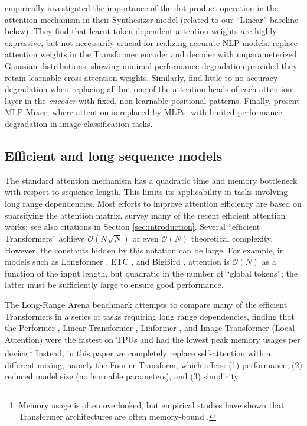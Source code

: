 \documentclass[11pt]{article}
\renewcommand{\O}[1]{$\mathcal{O}(#1)$}
\begin{document}
\citet{tay2020synthesizer} empirically investigated the importance of the dot product operation in the attention mechanism in their Synthesizer model (related to our ``Linear'' baseline below). They find that learnt token-dependent attention weights are highly expressive, but not necessarily crucial for realizing accurate NLP models. \citet{you2020hard} replace attention weights in the Transformer encoder and decoder with unparameterized Gaussian distributions, showing minimal performance degradation provided they retain learnable cross-attention weights. Similarly, \citet{raganato2020fixed} find little to no accuracy degradation when replacing all but one of the attention heads of each attention layer in the \emph{encoder} with fixed, non-learnable positional patterns. Finally, \citet{tolstikhin2021mlp} present MLP-Mixer, where attention is replaced by MLPs, with limited performance degradation in image classification tasks. 


\subsection{Efficient and long sequence models}
\label{subsec:efficient_transformers}

The standard attention mechanism \citep{vaswani2017attention} has a quadratic time and memory bottleneck with respect to sequence length. This limits its applicability in tasks involving long range dependencies. Most efforts to improve attention efficiency are based on sparsifying the attention matrix. \citet{tay2020efficient} survey many of the recent efficient attention works; see also citations in Section \ref{sec:introduction}. Several ``efficient Transformers'' achieve \O{N\sqrt{N}} or even \O{N} theoretical complexity. However, the constants hidden by this notation can be large. For example, in models such as Longformer \citep{beltagy2020longformer}, ETC \citep{ainslie2020etc}, and BigBird \citep{zaheer2020big}, attention is \O{N} as a function of the input length, but quadratic in the number of ``global tokens''; the latter must be sufficiently large to ensure good performance.

The Long-Range Arena benchmark \citep{tay2020long} attempts to compare many of the efficient Transformers in a series of tasks requiring long range dependencies, finding that the Performer \citep{choromanski2020rethinking}, Linear Transformer \citep{katharopoulos2020transformers}, Linformer \citep{wang2020linformer}, and Image Transformer (Local Attention) \citep{parmar2018image} were the fastest on TPUs and had the lowest peak memory usages per device.\footnote{Memory usage is often overlooked, but empirical studies have shown that Transformer architectures are often memory-bound \citep{ivanov2020data, shazeer2019fast}.} Instead, in this paper we completely replace self-attention with a different mixing, namely the Fourier Transform, which offers: (1) performance,
(2) reduced model size (no learnable parameters), and (3) simplicity.
\end{document}
